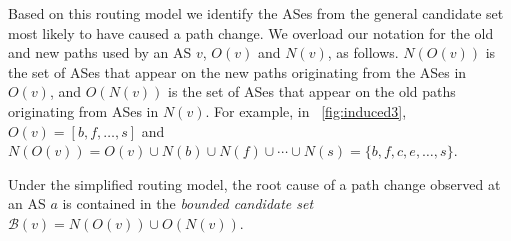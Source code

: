 Based on this routing model we
identify the ASes from the general candidate set most likely to have
caused a path change. We overload our notation for the old and new paths used by an AS $v$,
$O(v)$ and $N(v)$, as follows. $N(O(v))$ is the set of ASes that appear
on the new paths originating from the ASes in $O(v)$, and $O(N(v))$ is
the set of ASes that appear on the old paths originating from ASes in
$N(v)$.  For example, in \fig~\ref{fig:induced3}, $O(v) = [b, f, \ldots,
s]$ and $N(O(v)) = O(v) \cup N(b) \cup N(f) \cup \cdots \cup N(s) = \{b,
f, c, e, \ldots, s\}$.

\begin{theorem} Under the simplified routing model, the root cause of a
path change observed at an AS $a$ is contained in the \emph{bounded candidate
set} $\mathcal{B}(v) = N(O(v)) \cup O(N(v))$.
\end{theorem}

